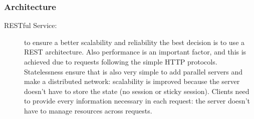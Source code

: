 \documentclass[a4paper]{article}
\begin{document}
    \subsubsection{Architecture}
    \begin{description}
        \item[RESTful Service:] to ensure a better scalability and reliability the best decision is to use a REST architecture. Also performance is an important factor, and this is achieved due to requests following the simple HTTP protocols. Statelessness ensure that is also very simple to add parallel servers and make a distributed network: scalability is improved because the server doesn't have to store the state (no session or sticky session). Clients need to provide every information necessary in each request: the server doesn't have to manage resources across requests.
    \end{description}
\end{document}
